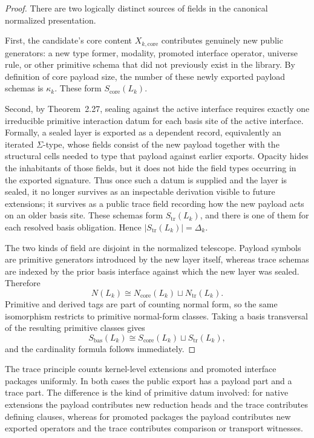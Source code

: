 \begin{proof}
There are two logically distinct sources of fields in the canonical normalized presentation.

First, the candidate's core content \(X_{k,\mathrm{core}}\) contributes genuinely new public
generators: a new type former, modality, promoted interface operator, universe rule, or
other primitive schema that did not previously exist in the library.  By definition of core
payload size, the number of these newly exported payload schemas is \(\kappa_k\).  These
form \(S_{\mathrm{core}}(L_k)\).

Second, by Theorem~2.27, sealing against the active interface requires exactly one irreducible
primitive interaction datum for each basis site of the active interface.  Formally, a sealed
layer is exported as a dependent record, equivalently an iterated \(\Sigma\)-type, whose fields
consist of the new payload together with the structural cells needed to type that payload
against earlier exports.  Opacity hides the inhabitants of those fields, but it does not hide
the field types occurring in the exported signature.  Thus once such a datum is supplied and
the layer is sealed, it no longer survives as an inspectable derivation visible to future
extensions; it survives as a public trace field recording how the new payload acts on an older
basis site.  These schemas form \(S_{\mathrm{tr}}(L_k)\), and there is one of them for each
resolved basis obligation.  Hence \(|S_{\mathrm{tr}}(L_k)|=\Delta_k\).

The two kinds of field are disjoint in the normalized telescope.  Payload symbols are
primitive generators introduced by the new layer itself, whereas trace schemas are indexed by
the prior basis interface against which the new layer was sealed.  Therefore
\[
  N(L_k) \cong N_{\mathrm{core}}(L_k) \sqcup N_{\mathrm{tr}}(L_k).
\]
Primitive and derived tags are part of counting normal form, so the same isomorphism
restricts to primitive normal-form classes.  Taking a basis transversal of the resulting
primitive classes gives
\[
  S_{\mathrm{bas}}(L_k) \cong S_{\mathrm{core}}(L_k) \sqcup S_{\mathrm{tr}}(L_k),
\]
and the cardinality formula follows immediately.
\end{proof}

\begin{remark}
The trace principle counts kernel-level extensions and promoted interface packages
uniformly.  In both cases the public export has a payload part and a trace part.  The
difference is the kind of primitive datum involved: for native extensions the payload
contributes new reduction heads and the trace contributes defining clauses, whereas for
promoted packages the payload contributes new exported operators and the trace contributes
comparison or transport witnesses.
\end{remark}

